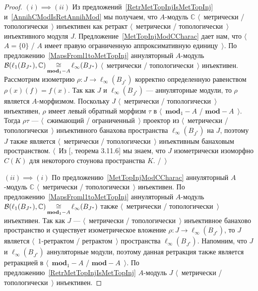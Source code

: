 \begin{proof} $(i) \implies (ii)$  Из
предложений~\ref{RetrMetTopInjIsMetTopInj} и~\ref{AnnihCModIsRetAnnihMod} мы
получаем, что $A$-модуль $\mathbb{C}$ $\langle$~метрически /
топологически~$\rangle$ инъективен как ретракт $\langle$~метрически /
топологически~$\rangle$ инъективного модуля $J$.
Предложение~\ref{MetTopInjModCCharac} дает нам, что $\langle$~$A= \{0 \}$ / $A$
имеет правую ограниченную аппроксимативную единицу~$\rangle$. По
предложению~\ref{MapsFroml1toMetTopInj} аннуляторный $A$-модуль
$\mathcal{B}(\ell_1(B_{J^*}),\mathbb{C})\mathop{\mathbin{\cong}}\limits_{\mathbf{mod}_1-A}\ell_\infty(B_{J^*})$
$\langle$~метрически / топологически~$\rangle$ инъективен. Рассмотрим изометрию
$\rho:J\to\ell_\infty(B_{J^*})$ корректно определенную равенством
$\rho(x)(f)=f(x)$. Так как $J$ и $\ell_\infty(B_{J^*})$ --- аннуляторные модули,
то $\rho$ является $A$-морфизмом. Поскольку $J$ $\langle$~метрически /
топологически~$\rangle$ инъективен, $\rho$ имеет левый обратный морфизм $\tau$ в
$\langle$~$\mathbf{mod}_1-A$ / $\mathbf{mod}-A$~$\rangle$. Тогда $\rho\tau$ ---
$\langle$~сжимающий / ограниченный~$\rangle$ проектор из $\langle$~метрически /
топологически~$\rangle$ инъективного банахова пространства
$\ell_\infty(B_{J^*})$ на $J$, поэтому $J$ также является $\langle$~метрически /
топологически~$\rangle$ инъективным банаховым пространством. $\langle$~Из
[\cite{LaceyIsomThOfClassicBanSp}, теорема 3.11.6] мы знаем, что $J$
изометрически изоморфно $C(K)$ для некоторого стоунова пространства $K$.
/~$\rangle$ 

$(ii) \implies(i)$ По предложению~\ref{MetTopInjModCCharac} аннуляторный
$A$-модуль $\mathbb{C}$ $\langle$~метрически / топологически~$\rangle$
инъективен. По предложению~\ref{MapsFroml1toMetTopInj} аннуляторный $A$-модуль
$\mathcal{B}(\ell_1(B_{J^*}),\mathbb{C})\mathop{\mathbin{\cong}}\limits_{\mathbf{mod}_1-A}\ell_\infty(B_{J^*})$
также $\langle$~метрически / топологически~$\rangle$ инъективен. Так как $J$ ---
$\langle$~метрически / топологически~$\rangle$ инъективное банахово пространство
и существует изометрическое вложение $\rho:J\to \ell_\infty(B_{J^*})$, то $J$
является $\langle$~$1$-ретрактом / ретрактом~$\rangle$ пространства
$\ell_\infty(B_{J^*})$. Напомним, что $J$ и $\ell_\infty(B_{J^*})$ аннуляторные
модули, поэтому данная ретракция также является ретракцией в
$\langle$~$\mathbf{mod}_1-A$ / $\mathbf{mod}-A$~$\rangle$. По
предложению~\ref{RetrMetTopInjIsMetTopInj} $A$-модуль $J$ $\langle$~метрически /
топологически~$\rangle$ инъективен.
\end{proof}

